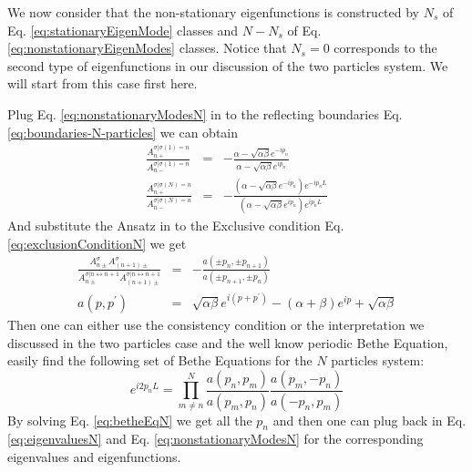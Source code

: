 \documentclass[12pt,a4paper]{article}
\begin{document}
We now consider that the non-stationary eigenfunctions is constructed by $N_s$ of
Eq. \eqref{eq:stationaryEigenMode} classes and $N-N_s$ of Eq.
\eqref{eq:nonstationaryEigenModes} classes. Notice that $N_s=0$ corresponds to
the second type of eigenfunctions in our discussion of the two particles system.
We will start from this case first here.

Plug Eq. \eqref{eq:nonstationaryModesN} in to the reflecting boundaries Eq.
\eqref{eq:boundaries-N-particles} we can obtain 
\begin{subequations}
    \label{eq:scatterFactorBoundaryN}
    \begin{eqnarray}
        \frac{A_{n+}^{\sigma|\sigma(1)=n}}{A_{n-}^{\sigma|\sigma(1)=n}} & = &
        -\frac{\alpha-\sqrt{\alpha\beta}
            e^{-ip_{n}}}{\alpha-\sqrt{\alpha\beta} e^{ip_{n}}}
        \\ \frac{A_{n+}^{\sigma|\sigma(N)=n}}{A_{n-}^{\sigma|\sigma(N)=n}} & = &
        -\frac{\left(\alpha-\sqrt{\alpha\beta} e^{-ip_{n}}\right)
            e^{-ip_{n}L}}{\left(\alpha-\sqrt{\alpha\beta}
                e^{ip_{n}}\right) e^{ip_{n}L}}
    \end{eqnarray}
\end{subequations}
And substitute the Ansatz in to the Exclusive condition Eq.
\eqref{eq:exclusionConditionN} we get
\begin{subequations}
    \label{eq:scatterFactorExclusiveN}
    \begin{eqnarray}
        \frac{A_{n\pm}^{\sigma}A_{(n+1)\pm}^{\sigma}}{A_{n\pm}^{\sigma|
                n\leftrightarrow n+1}A_{(n+1)\pm}^{\sigma|n\leftrightarrow n+1}}
        & = & -\frac{a(\pm p_{n},\pm p_{n+1})}{a(\pm p_{n+1}, \pm p_{n})} \\
        a(p, p^{\prime}) & = & \sqrt{\alpha\beta}e^{i(p+p^{\prime})} - (\alpha +
        \beta) e^{i p} + \sqrt{\alpha\beta}
    \end{eqnarray}
\end{subequations}
Then one can either use the consistency condition or the interpretation we
discussed in the two particles case and the well know periodic Bethe Equation,
easily find the following set of Bethe Equations for the $N$ particles system:
\begin{equation}
    \label{eq:betheEqN}
    e^{i2p_nL}  =  \prod_{m\neq n}^N\frac{a(p_n, p_m)}{a(p_m, p_n)} 
    \frac{a(p_m, -p_n)}{a(-p_n, p_m)}
\end{equation}
By solving Eq. \eqref{eq:betheEqN} we get all the $p_n$ and then one can plug
back in Eq. \eqref{eq:eigenvaluesN} and Eq. \eqref{eq:nonstationaryModesN} for
the corresponding eigenvalues and eigenfunctions. 
\end{document}
